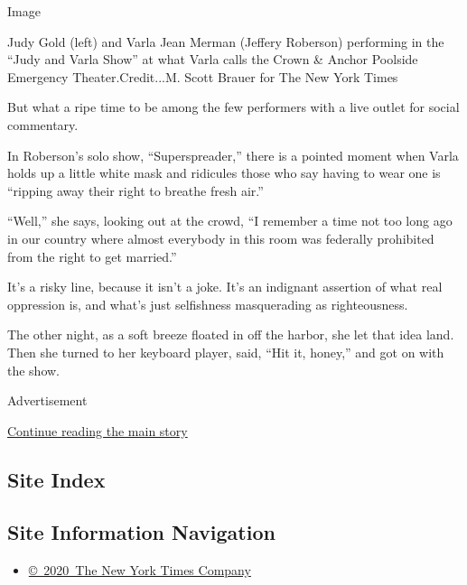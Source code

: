 Image

Judy Gold (left) and Varla Jean Merman (Jeffery Roberson) performing in
the ``Judy and Varla Show'' at what Varla calls the Crown \& Anchor
Poolside Emergency Theater.Credit...M. Scott Brauer for The New York
Times

But what a ripe time to be among the few performers with a live outlet
for social commentary.

In Roberson's solo show, ``Superspreader,'' there is a pointed moment
when Varla holds up a little white mask and ridicules those who say
having to wear one is ``ripping away their right to breathe fresh air.''

``Well,'' she says, looking out at the crowd, ``I remember a time not
too long ago in our country where almost everybody in this room was
federally prohibited from the right to get married.''

It's a risky line, because it isn't a joke. It's an indignant assertion
of what real oppression is, and what's just selfishness masquerading as
righteousness.

The other night, as a soft breeze floated in off the harbor, she let
that idea land. Then she turned to her keyboard player, said, ``Hit it,
honey,'' and got on with the show.

Advertisement

\protect\hyperlink{after-bottom}{Continue reading the main story}

\hypertarget{site-index}{%
\subsection{Site Index}\label{site-index}}

\hypertarget{site-information-navigation}{%
\subsection{Site Information
Navigation}\label{site-information-navigation}}

\begin{itemize}
\tightlist
\item
  \href{https://help.nytimes.com/hc/en-us/articles/115014792127-Copyright-notice}{©~2020~The
  New York Times Company}
\end{itemize}

